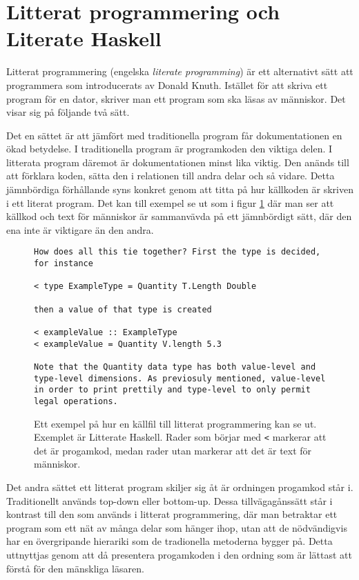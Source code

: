 \section{Litterat programmering och Literate Haskell}
\label{sec:lhs}

Litterat programmering (engelska \textit{literate programming}) är ett alternativt sätt att programmera som introducerats av Donald Knuth.\cite{knuth} Istället för att skriva ett program för en dator, skriver man ett program som ska läsas av människor. Det visar sig på följande två sätt.

Det en sättet är att jämfört med traditionella program får dokumentationen en ökad betydelse. I traditionella program är programkoden den viktiga delen. I litterata program däremot är dokumentationen minst lika viktig. Den anänds till att förklara koden, sätta den i relationen till andra delar och så vidare. Detta jämnbördiga förhållande syns konkret genom att titta på hur källkoden är skriven i ett literat program. Det kan till exempel se ut som i figur \ref{fig:litterate_haskell_exempel} där man ser att källkod och text för människor är sammanvävda på ett jämnbördigt sätt, där den ena inte är viktigare än den andra. 

\begin{figure}[H]
  \begin{lstlisting}[language={}]
How does all this tie together? First the type is decided, for instance

< type ExampleType = Quantity T.Length Double

then a value of that type is created

< exampleValue :: ExampleType
< exampleValue = Quantity V.length 5.3

Note that the Quantity data type has both value-level and type-level dimensions. As previosuly mentioned, value-level in order to print prettily and type-level to only permit legal operations.
  \end{lstlisting}
  \caption{Ett exempel på hur en källfil till litterat programmering kan se ut. Exemplet är Litterate Haskell. Rader som börjar med \texttt{<} markerar att det är progamkod, medan rader utan markerar att det är text för människor.}
  \label{fig:litterate_haskell_exempel}
\end{figure}

Det andra sättet ett litterat program skiljer sig åt är ordningen progamkod står i. Traditionellt används top-down eller bottom-up. Dessa tillvägagånssätt står i kontrast till den som används i litterat programmering, där man betraktar ett program som ett nät av många delar som hänger ihop, utan att de nödvändigvis har en övergripande hierariki som de tradionella metoderna bygger på. Detta uttnyttjas genom att då presentera progamkoden i den ordning som är lättast att förstå för den mänskliga läsaren.

